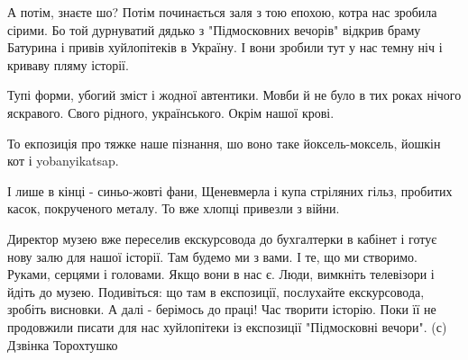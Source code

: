 А потім, знаєте шо? Потім починається заля з тою епохою, котра нас зробила
сірими. Бо той дурнуватий дядько з "Підмосковних вечорів" відкрив браму
Батурина і привів хуйлопітеків в Україну. І вони зробили тут у нас темну ніч і
криваву пляму історії. 

Тупі форми, убогий зміст і жодної автентики. Мовби й не було в тих роках нічого
яскравого. Свого  рідного, українського. Окрім нашої крові. 

То екпозиція про тяжке наше пізнання, шо воно таке йоксель-моксель, йошкін кот і yobanyikatsap.

І лише в кінці - синьо-жовті фани, Щеневмерла і купа стріляних гільз, пробитих
касок, покрученого металу. То вже хлопці привезли з війни.

Директор музею вже переселив екскурсовода до бухгалтерки в кабінет і готує нову залю для нашої історії. Там будемо ми з вами. І те, що ми створимо. Руками, серцями і головами. Якщо вони в нас є.
Люди, вимкніть телевізори і йдіть до музею. Подивіться: що там в експозиції, послухайте екскурсовода, зробіть висновки. 
А далі - берімось до праці! Час творити історію. 
Поки її не продовжили писати  для нас хуйлопітеки із експозиції "Підмосковні вечори".
(с) Дзвінка Торохтушко

